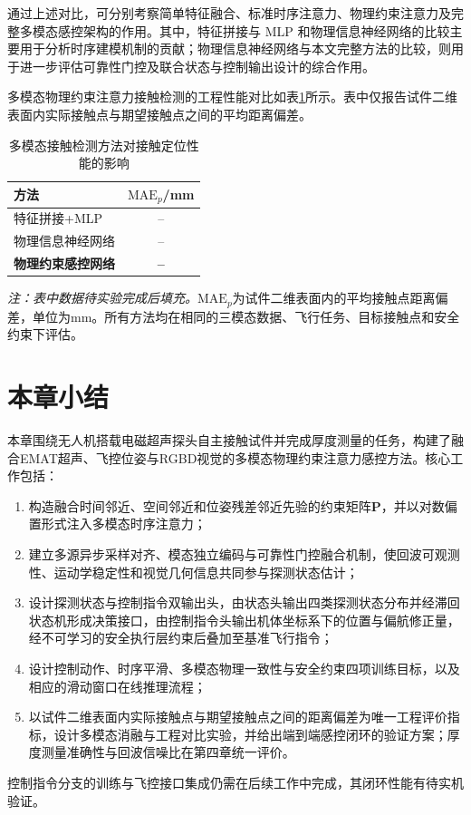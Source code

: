通过上述对比，可分别考察简单特征融合、标准时序注意力、物理约束注意力及完整多模态感控架构的作用。其中，特征拼接与 MLP 和物理信息神经网络的比较主要用于分析时序建模机制的贡献；物理信息神经网络与本文完整方法的比较，则用于进一步评估可靠性门控及联合状态与控制输出设计的综合作用。

多模态物理约束注意力接触检测的工程性能对比如表\ref{tab:mm_results}所示。表中仅报告试件二维表面内实际接触点与期望接触点之间的平均距离偏差。

\begin{table}[htbp]
\centering
\caption{多模态接触检测方法对接触定位性能的影响}
\label{tab:mm_results}
\begin{tabular}{lc}
\toprule
\textbf{方法} & \textbf{$\mathrm{MAE}_{p}$/mm} \\
\midrule
特征拼接+MLP & -- \\
物理信息神经网络 & -- \\
\textbf{物理约束感控网络} & \textbf{--} \\
\bottomrule
\end{tabular}
\end{table}

\textit{注：表中数据待实验完成后填充。}$\mathrm{MAE}_{p}$为试件二维表面内的平均接触点距离偏差，单位为mm。所有方法均在相同的三模态数据、飞行任务、目标接触点和安全约束下评估。

\section{本章小结}

本章围绕无人机搭载电磁超声探头自主接触试件并完成厚度测量的任务，构建了融合EMAT超声、飞控位姿与RGBD视觉的多模态物理约束注意力感控方法。核心工作包括：

\begin{enumerate}[
    label=(\arabic*),
    labelindent=\parindent,
    itemindent=0pt,
    labelwidth=2em,
    labelsep=0.5em,
    leftmargin=*
]
\item 构造融合时间邻近、空间邻近和位姿残差邻近先验的约束矩阵$\mathbf{P}$，并以对数偏置形式注入多模态时序注意力；
\item 建立多源异步采样对齐、模态独立编码与可靠性门控融合机制，使回波可观测性、运动学稳定性和视觉几何信息共同参与探测状态估计；
\item 设计探测状态与控制指令双输出头，由状态头输出四类探测状态分布并经滞回状态机形成决策接口，由控制指令头输出机体坐标系下的位置与偏航修正量，经不可学习的安全执行层约束后叠加至基准飞行指令；
\item 设计控制动作、时序平滑、多模态物理一致性与安全约束四项训练目标，以及相应的滑动窗口在线推理流程；
\item 以试件二维表面内实际接触点与期望接触点之间的距离偏差为唯一工程评价指标，设计多模态消融与工程对比实验，并给出端到端感控闭环的验证方案；厚度测量准确性与回波信噪比在第四章统一评价。
\end{enumerate}

控制指令分支的训练与飞控接口集成仍需在后续工作中完成，其闭环性能有待实机验证。
